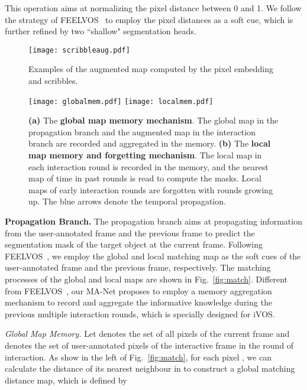 \documentclass[10pt,twocolumn,letterpaper]{article}
\begin{document}
This operation aims at normalizing the pixel distance between 0 and 1. 
We follow the strategy of FEELVOS~\cite{voigtlaender2019feelvos} to employ the pixel distances as a soft cue, which is further refined by two ``shallow" segmentation heads. 
\begin{figure}[t]
\texttt{[image: scribbleaug.pdf]}
\centering
\caption{Examples of the augmented map computed by the pixel embedding and scribbles.}
\vspace{-1.5em}
\label{fig:scribbleaug}
\end{figure}


\begin{figure*}[t]
\texttt{[image: globalmem.pdf]}
\texttt{[image: localmem.pdf]}
\centering
\caption{\textbf{(a)} The \textbf{global map memory mechanism}. The global map in the propagation branch and the augmented map in the interaction branch are recorded and aggregated in the memory. \textbf{(b)} The \textbf{local map memory and forgetting mechanism}. The local map in each interaction round is recorded in the memory, and the nearest map of time in past  rounds is read to compute the masks. Local maps of early interaction rounds are forgotten with rounds growing up. The blue arrows denote the temporal propagation.}
\vspace{-1.5em}
\label{fig:memory}
\end{figure*}






\textbf{Propagation Branch.}
The propagation branch aims at propagating information from the user-annotated frame and the previous frame to predict the segmentation mask of the target object at the current frame. Following FEELVOS~\cite{voigtlaender2019feelvos}, we employ the global and local matching map as the soft cues of the user-annotated frame and the previous frame, respectively. The matching processes of the global and local maps are shown in Fig.~\ref{fig:match}. Different from FEELVOS~\cite{voigtlaender2019feelvos}, our MA-Net proposes to employ a memory aggregation mechanism to record and aggregate the informative knowledge during the previous multiple interaction rounds, which is specially designed for iVOS. 

\emph{Global Map Memory.}
Let  denotes the set of all pixels of the current  frame and  
 denotes the set of user-annotated pixels of the interactive  frame in the  round of interaction. As show in the left of Fig.~\ref{fig:match}, for each pixel , we can calculate the distance of its nearest neighbour in  to construct a global matching distance map, which is defined by
\end{document}
